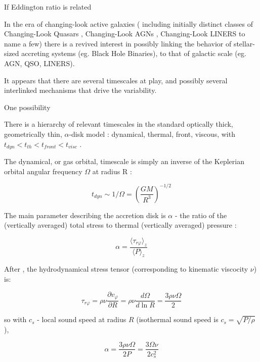 \documentclass[twocolumn]{aastex62}
\begin{document}
 If Eddington ratio is related 


In the era of changing-look active galaxies ( including initially distinct classes of Changing-Look Quasars \citep{lamassa2015, macleod2019}, Changing-Look AGNs \citep{marchese2012, bianchi2009,risaliti2009}, Changing-Look LINERS \citep{frederick2019} to name a few) there is a revived interest in possibly linking the behavior of stellar-sized accreting systems (eg. Black Hole Binaries),  to that of galactic scale (eg. AGN, QSO, LINERS)\citep{noda2018}. 

It appears that there are several timescales at play, and possibly several interlinked mechanisms that drive the variability. 



One possibility

There is a hierarchy of relevant timescales in the standard optically thick, geometrically thin, $\alpha$-disk model : dynamical, thermal, front, viscous, with   $t_{dyn} < t_{th} < t_{front}  < t_{visc} $ \citep{netzer2013, frank2002}.

The dynamical, or gas orbital, timescale is simply  an inverse of the Keplerian orbital angular frequency $ \Omega$  at radius R  : 

\begin{equation}
t_{dyn} \sim  1 / \Omega = \left( \frac{GM}{R^{3}}\right)^{-1/2}
\end{equation}




The main parameter  describing the accretion disk is $\alpha$ - the ratio of the (vertically averaged) total stress to thermal (vertically averaged) pressure \citep{lasota2016} : 

\begin{equation}
\alpha= \frac{\langle \tau_{r\varphi}  \rangle_{z} }{\langle P \rangle _{z}} 
\end{equation}


After \cite{lasota2016},  the hydrodynamical stress tensor (corresponding to  kinematic viscocity $\nu$) is:

\begin{equation}
\tau_{r\varphi } = \rho \nu \frac{\partial v_{\varphi}}{\partial R} = \rho \nu \frac{d \Omega}{d \ln{R}} = \frac{3 \rho \nu \Omega}{2}  
\end{equation}

so  with  $c_{s}$ -  local sound speed at radius $R$ (isothermal sound speed is $c_{s} = \sqrt{P/\rho}$),

\begin{equation}
\alpha  =   \frac{3 \rho \nu \Omega}{2 P} =  \frac{3 \Omega \nu}{2 c_{s}^{2}}
\end{equation}
\end{document}
